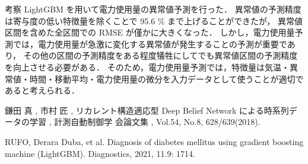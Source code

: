 \documentclass[a4paper,10pt]{jarticle}
\makeatletter
\renewcommand{\section}{\@startsection{section}{1}{\z@}
  {1.5\Cvs \@plus.5\Cvs \@minus.2\Cvs}
  {.5\Cvs \@plus.3\Cvs}%
  {\reset@font\large\bfseries}}   %
\makeatother
\begin{document}
\vspace{-7mm}
\section{考察}
\vspace{-2mm}
LightGBM を用いて電力使用量の異常値予測を行った．
異常値の予測精度は寄与度の低い特徴量を除くことで 95.6 \% まで上げることができたが，
異常値区間を含めた全区間での RMSE が僅かに大きくなった．
しかし，電力使用量予測では，電力使用量が急激に変化する異常値が発生することの予測が重要であり，
その他の区間の予測精度をある程度犠牲にしてでも異常値区間の予測精度を向上させる必要がある．
そのため，電力使用量予測では，特徴量は気温・異常値・時間・移動平均・電力使用量の微分を入力データとして使うことが適切であると考えられる．
\vspace{-6mm}
\begin{thebibliography}{9}
    \vspace{-2mm}
      
    鎌田 真 , 市村 匠 , リカレント構造適応型 Deep Belief Network による時系列データの学習 , 計測自動制御学 会論文集 , Vol.54, No.8, 628/639(2018).
      
    \vspace{-2mm}

    RUFO, Derara Duba, et al. Diagnosis of diabetes mellitus using gradient boosting machine (LightGBM). Diagnostics, 2021, 11.9: 1714.
\end{thebibliography}
\end{document}
